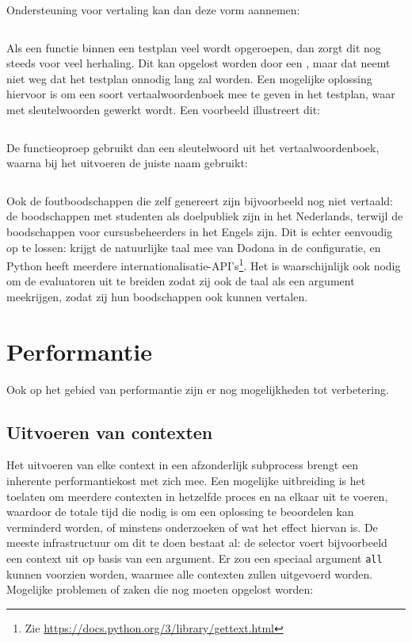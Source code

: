 \inputminted{json}{code/example-name.json}

Ondersteuning voor vertaling kan dan deze vorm aannemen:

\inputminted{json}{code/example-name-trans.json}

Als een functie binnen een testplan veel wordt opgeroepen, dan zorgt dit nog steeds voor veel herhaling.
Dit kan opgelost worden door een , maar dat neemt niet weg dat het testplan onnodig lang zal worden.
Een mogelijke oplossing hiervoor is om een soort vertaalwoordenboek mee te geven in het testplan, waar met sleutelwoorden gewerkt wordt.
Een voorbeeld illustreert dit:

\inputminted{json}{code/example-name-dict.json}

De functieoproep gebruikt dan een sleutelwoord uit het vertaalwoordenboek, waarna \tested{} bij het uitvoeren de juiste naam gebruikt:

\inputminted{json}{code/example-name-key.json}

Ook de foutboodschappen die \tested{} zelf genereert zijn bijvoorbeeld nog niet vertaald: de boodschappen met studenten als doelpubliek zijn in het Nederlands, terwijl de boodschappen voor cursusbeheerders in het Engels zijn.
Dit is echter eenvoudig op te lossen: \tested{} krijgt de natuurlijke taal mee van Dodona in de configuratie, en Python heeft meerdere internationalisatie-API's\footnote{Zie \url{https://docs.python.org/3/library/gettext.html}}.
Het is waarschijnlijk ook nodig om de evaluatoren uit te breiden zodat zij ook de taal als een argument meekrijgen, zodat zij hun boodschappen ook kunnen vertalen.

\section{Performantie}\label{sec:future-performantie}

Ook op het gebied van performantie zijn er nog mogelijkheden tot verbetering.

\subsection{Uitvoeren van contexten}\label{subsec:future-performance}

Het uitvoeren van elke context in een afzonderlijk subprocess brengt een inherente performantiekost met zich mee.
Een mogelijke uitbreiding is het toelaten om meerdere contexten in hetzelfde proces en na elkaar uit te voeren, waardoor de totale tijd die nodig is om een oplossing te beoordelen kan verminderd worden, of minstens onderzoeken of wat het effect hiervan is.
De meeste infrastructuur om dit te doen bestaat al: de selector voert bijvoorbeeld een context uit op basis van een argument.
Er zou een speciaal argument \texttt{all} kunnen voorzien worden, waarmee alle contexten zullen uitgevoerd worden.
Mogelijke problemen of zaken die nog moeten opgelost worden:

